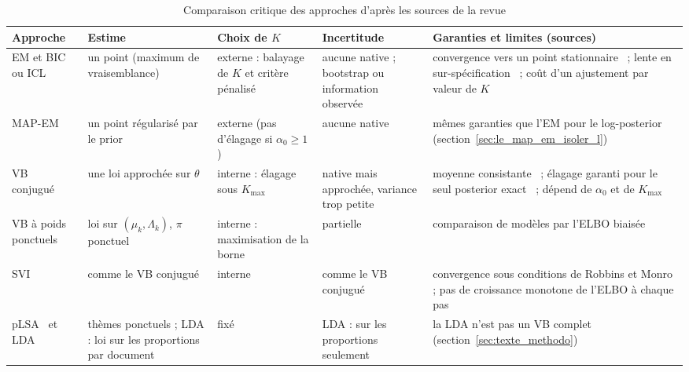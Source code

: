 \begin{table}[H]
\centering
\scriptsize
\setlength{\tabcolsep}{0.12cm}
\begin{tabular}{|>{\raggedright\arraybackslash}p{2.3cm}|>{\raggedright\arraybackslash}p{2.4cm}|>{\raggedright\arraybackslash}p{2.6cm}|>{\raggedright\arraybackslash}p{2.6cm}|>{\raggedright\arraybackslash}p{4.2cm}|}
\hline
\textbf{Approche} & \textbf{Estime} & \textbf{Choix de $K$} & \textbf{Incertitude} & \textbf{Garanties et limites (sources)} \\
\hline
EM et BIC ou ICL & un point (maximum de vraisemblance) & externe : balayage de $K$ et critère pénalisé~\cite{biernacki2000} & aucune native ; bootstrap ou information observée~\cite{louis1982,meng1991} & convergence vers un point stationnaire~\cite{wu1983} ; lente en sur-spécification~\cite{dwivedi2020} ; coût d'un ajustement par valeur de $K$ \\
\hline
MAP-EM & un point régularisé par le prior & externe (pas d'élagage si $\alpha_0 \geq 1$) & aucune native & mêmes garanties que l'EM pour le log-posterior (section~\ref{sec:le_map_em_isoler_l}) \\
\hline
VB conjugué~\cite{attias2000,bishop2006} & une loi approchée sur $\theta$ & interne : élagage sous $K_{\max}$ & native mais approchée, variance trop petite~\cite{wang2005} & moyenne consistante~\cite{wang2006} ; élagage garanti pour le seul posterior exact~\cite{rousseau2011} ; dépend de $\alpha_0$ et de $K_{\max}$ \\
\hline
VB à poids ponctuels~\cite{corduneanu2001} & loi sur $(\mu_k, \Lambda_k)$, $\pi$ ponctuel & interne : maximisation de la borne & partielle & comparaison de modèles par l'ELBO biaisée~\cite{corduneanu2001} \\
\hline
SVI~\cite{hoffman2013} & comme le VB conjugué & interne & comme le VB conjugué & convergence sous conditions de Robbins et Monro ; pas de croissance monotone de l'ELBO à chaque pas \\
\hline
pLSA~\cite{hofmann1999} et LDA~\cite{blei2003} & thèmes ponctuels ; LDA : loi sur les proportions par document & fixé & LDA : sur les proportions seulement & la LDA n'est pas un VB complet (section~\ref{sec:texte_methodo}) \\
\hline
\end{tabular}
\caption{Comparaison critique des approches d'après les sources de la revue}
\label{tab:ea_comparaison}
\end{table}


